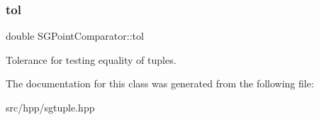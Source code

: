 \subsubsection{\texorpdfstring{tol}{tol}}
{\footnotesize\ttfamily double S\+G\+Point\+Comparator\+::tol\hspace{0.3cm}{\ttfamily [private]}}

Tolerance for testing equality of tuples. 

The documentation for this class was generated from the following file\+:\begin{DoxyCompactItemize}
\item 
src/hpp/sgtuple.\+hpp\end{DoxyCompactItemize}

